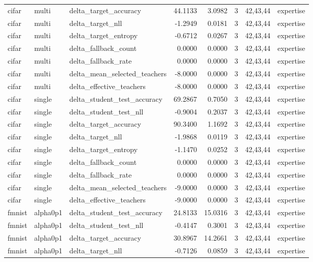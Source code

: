 \begin{tabular}{lllrrrll}
cifar & multi & delta\_target\_accuracy & 44.1133 & 3.0982 & 3 & 42,43,44 & expertise \\
cifar & multi & delta\_target\_nll & -1.2949 & 0.0181 & 3 & 42,43,44 & expertise \\
cifar & multi & delta\_target\_entropy & -0.6712 & 0.0267 & 3 & 42,43,44 & expertise \\
cifar & multi & delta\_fallback\_count & 0.0000 & 0.0000 & 3 & 42,43,44 & expertise \\
cifar & multi & delta\_fallback\_rate & 0.0000 & 0.0000 & 3 & 42,43,44 & expertise \\
cifar & multi & delta\_mean\_selected\_teachers & -8.0000 & 0.0000 & 3 & 42,43,44 & expertise \\
cifar & multi & delta\_effective\_teachers & -8.0000 & 0.0000 & 3 & 42,43,44 & expertise \\
cifar & single & delta\_student\_test\_accuracy & 69.2867 & 0.7050 & 3 & 42,43,44 & expertise \\
cifar & single & delta\_student\_test\_nll & -0.9004 & 0.2037 & 3 & 42,43,44 & expertise \\
cifar & single & delta\_target\_accuracy & 90.3400 & 1.1692 & 3 & 42,43,44 & expertise \\
cifar & single & delta\_target\_nll & -1.9868 & 0.0119 & 3 & 42,43,44 & expertise \\
cifar & single & delta\_target\_entropy & -1.1470 & 0.0252 & 3 & 42,43,44 & expertise \\
cifar & single & delta\_fallback\_count & 0.0000 & 0.0000 & 3 & 42,43,44 & expertise \\
cifar & single & delta\_fallback\_rate & 0.0000 & 0.0000 & 3 & 42,43,44 & expertise \\
cifar & single & delta\_mean\_selected\_teachers & -9.0000 & 0.0000 & 3 & 42,43,44 & expertise \\
cifar & single & delta\_effective\_teachers & -9.0000 & 0.0000 & 3 & 42,43,44 & expertise \\
fmnist & alpha0p1 & delta\_student\_test\_accuracy & 24.8133 & 15.0316 & 3 & 42,43,44 & expertise \\
fmnist & alpha0p1 & delta\_student\_test\_nll & -0.4147 & 0.3001 & 3 & 42,43,44 & expertise \\
fmnist & alpha0p1 & delta\_target\_accuracy & 30.8967 & 14.2661 & 3 & 42,43,44 & expertise \\
fmnist & alpha0p1 & delta\_target\_nll & -0.7126 & 0.0859 & 3 & 42,43,44 & expertise \\

\end{tabular}
